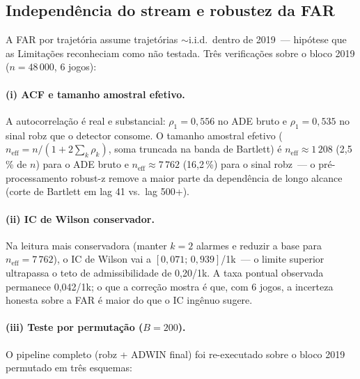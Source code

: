 \documentclass[11pt,a4paper]{article}
\begin{document}
\subsection{Independ\^encia do stream e robustez da FAR}

A FAR por trajet\'oria assume trajet\'orias ${\sim}$i.i.d.\ dentro de
2019~--- hip\'otese que as Limita\c{c}\~oes reconheciam como n\~ao
testada. Tr\^es verifica\c{c}\~oes sobre o bloco 2019
($n\!=\!48\,000$, 6 jogos):

\paragraph{(i) ACF e tamanho amostral efetivo.}
A autocorrela\c{c}\~ao \'e real e substancial: $\rho_1\!=\!0{,}556$ no
ADE bruto e $\rho_1\!=\!0{,}535$ no sinal robz que o detector consome.
O tamanho amostral efetivo
($n_\text{eff} = n/(1+2\sum_k \rho_k)$, soma truncada na banda de
Bartlett) \'e $n_\text{eff}\!\approx\!1\,208$ (2{,}5\,\% de $n$) para o
ADE bruto e $n_\text{eff}\!\approx\!7\,762$ (16{,}2\,\%) para o sinal
robz~--- o pr\'e-processamento robust-z remove a maior parte da
depend\^encia de longo alcance (corte de Bartlett em lag 41 vs.\ lag
500+).

\paragraph{(ii) IC de Wilson conservador.}
Na leitura mais conservadora (manter $k\!=\!2$ alarmes e reduzir a base
para $n_\text{eff}\!=\!7\,762$), o IC de Wilson vai a
$[0{,}071;\,0{,}939]$/1k~--- o limite superior ultrapassa o teto de
admissibilidade de 0{,}20/1k. A taxa pontual observada permanece
0{,}042/1k; o que a corre\c{c}\~ao mostra \'e que, com 6 jogos, a
incerteza honesta sobre a FAR \'e maior do que o IC ing\^enuo sugere.

\paragraph{(iii) Teste por permuta\c{c}\~ao ($B\!=\!200$).}
O pipeline completo (robz + ADWIN final) foi re-executado sobre o bloco
2019 permutado em tr\^es esquemas:
\end{document}
